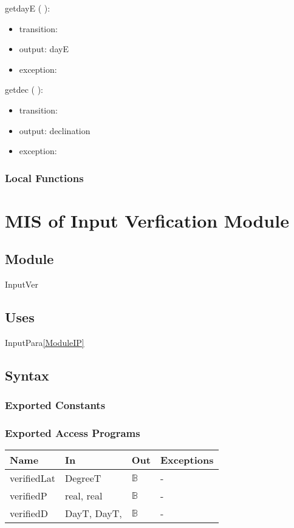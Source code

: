 \documentclass[12pt, titlepage]{article}
\begin{document}
\noindent  getdayE ( ):
\begin{itemize}
\item transition: 
\item output: dayE
\item exception: 
\end{itemize}

\noindent  getdec ( ):
\begin{itemize}
\item transition: 
\item output: declination
\item exception: 
\end{itemize}

\subsubsection{Local Functions}



\newpage



\section{MIS of Input Verfication Module} \label{ModuleIV} 

\subsection{Module}
InputVer

\subsection{Uses}
InputPara\ref{ModuleIP}

\subsection{Syntax}

\subsubsection{Exported Constants}


\subsubsection{Exported Access Programs}

\begin{center}
\begin{tabular}{p{2cm} p{5cm} p{2cm} p{5cm}}
\hline
\textbf{Name} & \textbf{In} & \textbf{Out} & \textbf{Exceptions} \\
\hline 
verifiedLat & DegreeT& $\mathbb{B}$ & - \\
verifiedP &  real, real & $\mathbb{B}$ & - \\
verifiedD & DayT, DayT, & $\mathbb{B}$ & - \\
\hline
\end{tabular}
\end{center}
\end{document}
